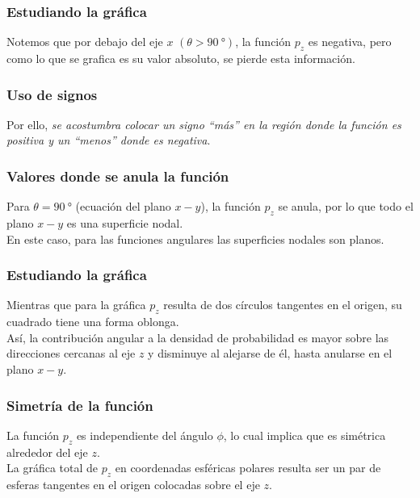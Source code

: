 \documentclass[12pt]{beamer}
\begin{document}
\begin{frame}
\frametitle{Estudiando la gráfica}
Notemos que por debajo del eje $x$ $(\theta > \SI{90}{\degree})$, la función $p_{z}$ es negativa, pero como lo que se grafica es su valor absoluto, se pierde esta información.
\end{frame}
\begin{frame}
\frametitle{Uso de signos}
Por ello, \emph{se acostumbra colocar un signo \enquote{más} en la región donde la función es positiva y un \enquote{menos} donde es negativa}.
\end{frame}
\begin{frame}
\frametitle{Valores donde se anula la función}
Para $\theta = \SI{90}{\degree}$ (ecuación del plano $x-y$), la función $p_{z}$ se anula, por lo que todo el plano $x-y$ es una superficie nodal.
\\
\bigskip
\pause
En este caso, para las funciones angulares las superficies nodales son planos.
\end{frame}
\begin{frame}
\frametitle{Estudiando la gráfica}
Mientras que para la gráfica $p_{z}$ resulta de dos círculos tangentes en el origen, su cuadrado tiene una forma oblonga.
\\
\bigskip
\pause
Así, la contribución angular a la densidad de probabilidad es mayor sobre las direcciones cercanas al eje $z$ y disminuye al alejarse de él, hasta anularse en el plano $x-y$.
\end{frame}
\begin{frame}
\frametitle{Simetría de la función}
La función $p_{z}$ es independiente del ángulo $\phi$, lo cual implica que es simétrica alrededor del eje $z$.
\\
\bigskip
\pause
La gráfica total de $p_{z}$ en coordenadas esféricas polares resulta ser un par de esferas tangentes en el origen colocadas sobre el eje $z$.
\end{frame}
\end{document}

